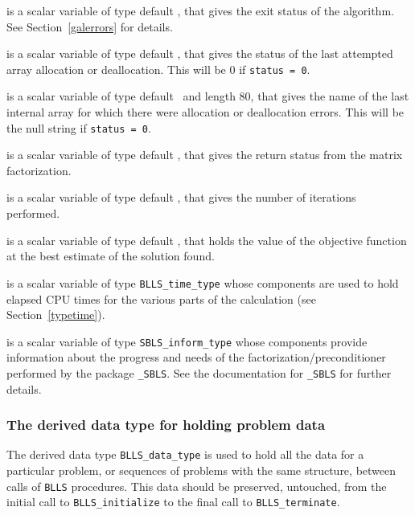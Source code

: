 \documentclass{galahad}
\newcommand{\packagename}{BLLS}
\begin{document}
\begin{description}

 is a scalar variable of type default \integer, that gives the
exit status of the algorithm.
See Section~\ref{galerrors}
for details.

 is a scalar variable of type default \integer, that gives
the status of the last attempted array allocation or deallocation.
This will be 0 if {\tt status = 0}.

 is a scalar variable of type default \character\
and length 80, that  gives the name of the last internal array
for which there were allocation or deallocation errors.
This will be the null string if {\tt status = 0}.

 is a scalar variable of type default \integer, that
gives the return status from the matrix factorization.

 is a scalar variable of type default \integer, that
gives the number of iterations performed.

 is a scalar variable of type default \realdp, that holds the
value of the objective function at the best estimate of the solution found.

 is a scalar variable of type {\tt \packagename\_time\_type}
whose components are used to hold elapsed CPU times for the various parts
of the calculation (see Section~\ref{typetime}).

 is a scalar variable of type
{\tt SBLS\_inform\_type} %
whose components provide information about the progress and needs
of the factorization/preconditioner
performed by the package
{\tt \libraryname\_SBLS}.
See the documentation for {\tt \libraryname\_SBLS} for further details.

\end{description}


\subsubsection{The derived data type for holding problem data}\label{typedata}
The derived data type
{\tt \packagename\_data\_type}
is used to hold all the data for a particular problem,
or sequences of problems with the same structure, between calls of
{\tt \packagename} procedures.
This data should be preserved, untouched, from the initial call to
{\tt \packagename\_initialize}
to the final call to
{\tt \packagename\_terminate}.
\end{document}
